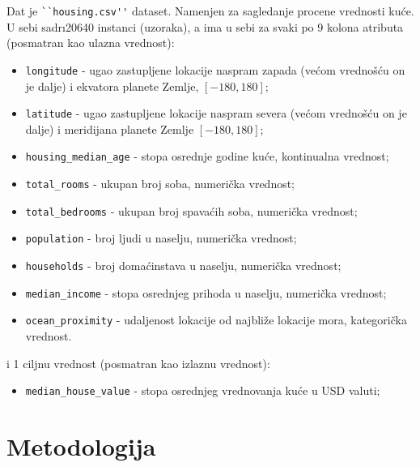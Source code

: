 \documentclass[fontsize=12bp, paper=a4]{scrarticle}
\begin{document}
Dat je \verb|``housing.csv''| dataset.\cite{dataset} Namenjen za sagledanje procene vrednosti kuće. U sebi sadr\i 20640 instanci (uzoraka), a ima u sebi za svaki po 9 kolona atributa (posmatran kao ulazna vrednost):
\begin{itemize}
    
    \item \verb|longitude| - ugao zastupljene lokacije naspram zapada (većom vrednošću on je dalje) i ekvatora planete Zemlje, $[-180, 180]$;
    \item \verb|latitude| - ugao zastupljene lokacije naspram severa (većom vrednošću on je dalje) i meridijana planete Zemlje $[-180, 180]$;
    \item \verb|housing_median_age| - stopa osrednje godine kuće, kontinualna vrednost;
    \item \verb|total_rooms| - ukupan broj soba, numerička vrednost;
    \item \verb|total_bedrooms| - ukupan broj spavaćih soba, numerička vrednost;
    \item \verb|population| - broj ljudi u naselju, numerička vrednost;
    \item \verb|households| - broj domaćinstava u naselju, numerička vrednost;
    \item \verb|median_income| - stopa osrednjeg prihoda u  naselju, numerička vrednost;
    \item \verb|ocean_proximity| - udaljenost lokacije od najbliže lokacije mora, kategorička vrednost.
\end{itemize}
i 1 ciljnu vrednost (posmatran kao izlaznu vrednost):
\begin{itemize}
    \item \verb|median_house_value| - stopa osrednjeg vrednovanja kuće u USD valuti;
\end{itemize}

\newpage
\section{Metodologija}
\end{document}
